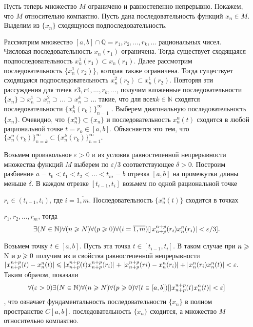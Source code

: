 Пусть теперь множество $M$ ограничено и равностепенно непрерывно. Покажем, что $M$
относительно компактно. Пусть дана последовательность функций $x_n \in  M $. Выделим
из $\{x_n\}$ сходящуюся подпоследовательность.


Рассмотрим множество $[a, b] \cap \mathbb{Q}  =  {r_1, r_2, \dots, r_k, \dots}$ рациональных  чисел.
Числовая последовательность ${x_n(r_1)}$ ограничена. Тогда существует сходящаяся
подпоследовательность ${x^1_n (r_1)} \subset {x_n(r_1)}$. 
Далее рассмотрим последовательность
$\{x^1_n (r_2)\}$, которая также ограничена. 
Тогда существует сходящаяся  подпоследовательность
${x^2_n (r_2)} \subset {x^1_n (r_2)}$.  Повторяя  эти  рассуждения для точек
$r3, r4, \dots, r_k, \dots$, получим вложенные последовательности
$\{x_n\} \supset  {x^1_n } \supset {x^2_n } \supset \dots \supset {x^k_n} \supset \dots$
такие, что для всех$ k \in  \mathbb{N} $ сходятся последовательности $\{x^k_n(r_k)\}^\infty_{n=1}$    . Выберем диагональную последовательность $\{x_n\}$.
Очевидно, что $\{x^n_n\} \subset \{x_n\}$ и последовательность ${x^n_n(t)}$
сходится в любой рациональной точке $t = r_k \in  [a, b]$. Объясняется это тем, что
$\{x^n_n(r_k)\}^\infty_{n=k}	\subset \{x^k_n(r_k)\}^\infty_{n=1}.$  

Возьмем произвольное $\varepsilon  > 0$ и из условия равностепенной непрерывности множества
функций $M$ выберем по $\varepsilon /3$ соответствующее $\delta > 0$. Построим разбиение
$a = t_0 < t_1 < t_2 < \dots < t_m = b$ отрезка $[a, b]$ на промежутки длины меньше $\delta$.
В каждом отрезке $[t_{i-1}, t_i]$ возьмем по одной рациональной точке

$r_i  \in  (t_{i-1}, t_i)$,  где  $i  =  \overline{1, m}$.  
Последовательность  $\{x^n_n(t)\}$ сходится  в  точках

$r_1, r_2, \dots, r_m$, тогда
$$\exists(N  \in  \mathbb{N})\forall(n \geqslant N )\forall(p \geqslant 0)\forall(i = \overline{1,m}) [|x^{n+p}_{n+p}(r_i)
        x^n_n(r_i)| < \varepsilon /3 ].$$

Возьмем точку $t \in  [a, b]$. Пусть эта точка $t \in  [t_{i-1}, t_i]$. В таком случае при
$n \geqslant$ N и $p \geqslant 0$ получим из и свойства равностепенной непрерывности
$|x^{n+p}_{n+p}(t)- x^n_n(t)| \leqslant  |x^{n+p}_{n+p}(t) x^{n+p}_{n+p}(r_i)|+|x^{n+p}_{n+p}(ri) -x_n^n(r_i)|+|x^n_n(r_i) x^n_n(t)| < \varepsilon.$ 
Таким образом, показали
$$\forall(\varepsilon  > 0)\exists(N  \in  \mathbb{N})\forall(n \geqslant N )\forall(p \geqslant 0)\forall(t \in  [a, b])
    [ |x^{n+p}_{n+p}(t) x^n_n(t)| < \varepsilon  ]$$,
что означает фундаментальность последовательности $\{x_n\}$ в полном пространстве $C[a, b]$.
\Rightarrow последовательность $\{x_n\}$ сходится, а множество $M$ относительно компактно.

